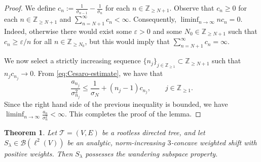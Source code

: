 \documentclass[11pt, reqno, a4paper]{amsart}
\newtheorem{theorem}{Theorem}[section]
\theoremstyle{definition}
\newcommand{\calB}{{\mathcal{B}}}
\newcommand{\scrT}{{\mathscr T}}
\renewcommand{\le}{\leqslant}
\renewcommand{\ge}{\geqslant}
\newcommand{\Z}{\mathbb Z}
\numberwithin{equation}{section}
\begin{document}
\begin{proof}
    We define $c_n := \frac{1}{\sigma_{n-1}} - \frac{1}{\sigma_n}$ for each $n \in \Z_{\ge N+1}$. Observe that $c_n \ge 0$ for each $n \in \Z_{\ge N+1}$ and $\sum_{n = N+1}^{\infty} c_n < \infty$. Consequently, $\liminf_{n \to \infty} nc_n = 0$. Indeed, otherwise there would exist some $\varepsilon > 0$ and some $N_0 \in \Z_{\ge N+1}$ such that $c_n \ge \varepsilon/n$ for all $n \in \Z_{\ge N_0}$, but this would imply that $\sum_{n = N+1}^{\infty} c_n = \infty$.

    We now select a strictly increasing sequence $\{ n_j \}_{j \in \Z_{\ge 1}} \subset \Z_{\ge N+1}$ such that $n_j c_{n_j} \to 0$. From \eqref{eq:Cesaro-estimate}, we have that 
    \begin{equation*}
        \frac{a_{n_j}}{\sigma_{n_j} ^2} \le \frac{1}{\sigma_N} + (n_j - 1) c_{n_j}, \qquad j \in \Z_{\ge 1}.
    \end{equation*}
    Since the right hand side of the previous inequality is bounded, we have $\liminf_{n \to \infty} \frac{a_{n}}{\sigma_{n} ^2} < \infty$. This completes the proof of the lemma.
\end{proof}

\begin{theorem}
    Let $\scrT = ( V,  E)$ be a rootless directed tree, and let $S_{\lambda} \in \calB (\ell ^2 ( V))$ be an analytic, norm-increasing $3$-concave weighted shift with positive weights. Then $S_{\lambda}$ possesses the wandering subspace property.
    \label{thm:result-for-positive-weights}
\end{theorem}
\end{document}
